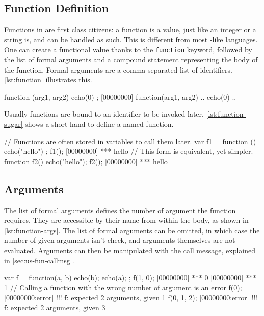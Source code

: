 \subsection{Function Definition}

Functions in \us are first class citizens:  a function is a
value, just like an integer
or a string is, and can be handled as such.
This is different from most \C-like languages.
One can create a functional value thanks to the
\lstinline|function| keyword, followed by the list of formal arguments
and a compound statement representing the body of the function. Formal arguments
are a comma separated list of identifiers. \autoref{lst:function} illustrates
this.

\begin{urbiscript}[caption=Functional value,label=lst:function,float=\floatpos]
function (arg1, arg2) { echo(0) };
[00000000] function(arg1, arg2) {
..  echo(0)
..}
\end{urbiscript}

Usually functions are bound to an identifier to be invoked later.
\autoref{lst:function-sugar} shows a short-hand to define a named
function.

\begin{urbiscript}[caption=Named functions,
  label=lst:function-sugar,float=\floatpos]
// Functions are often stored in variables to call them later.
var f1 = function () {
  echo("hello")
};
f1();
[00000000] *** hello
// This form is equivalent, yet simpler.
function f2()
{
  echo("hello");
}
f2();
[00000000] *** hello
\end{urbiscript}


\subsection{Arguments}

The list of formal arguments defines the number of argument the
function requires. They are accessible by their name from within the
body, as shown in \autoref{lst:function-args}. The list of formal arguments
can be omitted, in which case the number of given arguments isn't
check, and arguments themselves are not evaluated. Arguments can then
be manipulated with the call message, explained in
\autoref{sec:us-fun-callmsg}.

\begin{urbiscript}[caption=Storing and calling
  functions,label=lst:function-args,float=\floatpos]
var f = function(a, b) {
  echo(b);
  echo(a);
};
f(1, 0);
[00000000] *** 0
[00000000] *** 1
// Calling a function with the wrong number of argument is an error
f(0);
[00000000:error] !!! f: expected 2 arguments, given 1
f(0, 1, 2);
[00000000:error] !!! f: expected 2 arguments, given 3
\end{urbiscript}

